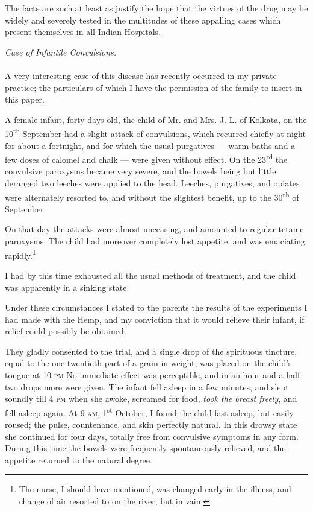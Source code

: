 \documentclass[a4paper, 11pt, oneside, polutonikogreek, english]{article}
\begin{document}
The facts are such at least as justify the hope that the virtues of the drug may be widely and severely tested in the multitudes of these appalling cases which present themselves in all Indian Hospitals.
\begin{center}
\emph{Case of Infantile Convulsions.}
\end{center}
\paragraph{}
A very interesting case of this disease has recently occurred in my private practice; the particulars of which I have the permission of the family to insert in this paper.

A female infant, forty days old, the child of Mr. and Mrs. J. L. of Kolkata, on the 10\textsuperscript{th} September had a slight attack of convulsions, which recurred chiefly at night for about a fortnight, and for which the usual purgatives --- warm baths and a few doses of calomel and chalk --- were given without effect. On the 23\textsuperscript{rd} the convulsive paroxysms became very severe, and the bowels being but little deranged two leeches were applied to the head. Leeches, purgatives, and opiates were alternately resorted to, and without the slightest benefit, up to the 30\textsuperscript{th} of September.

On that day the attacks were almost unceasing, and amounted to regular tetanic paroxysms. The child had moreover completely lost appetite, and was emaciating rapidly.\footnote{The nurse, I should have mentioned, was changed early in the illness, and change of air resorted to on the river, but in vain.}

I had by this time exhausted all the usual methods of treatment, and the child was apparently in a sinking state.

Under these circumstances I stated to the parents the results of the experiments I had made with the Hemp, and my conviction that it would relieve their infant, if relief could possibly be obtained.

They gladly consented to the trial, and a single drop of the spirituous tincture, equal to the one-twentieth part of a grain in weight, was placed on the child's tongue at 10 \textsc{pm} No immediate effect was perceptible, and in an hour and a half two drops more were given. The infant fell asleep in a few minutes, and slept soundly till 4 \textsc{pm} when she awoke, screamed for food, \emph{took the breast freely}, and fell asleep again. At 9 \textsc{am}, 1\textsuperscript{st} October, I found the child fast asleep, but easily roused; the pulse, countenance, and skin perfectly natural. In this drowsy state she continued for four days, totally free from convulsive symptoms in any form. During this time the bowels were frequently spontaneously relieved, and the appetite returned to the natural degree.
\end{document}
